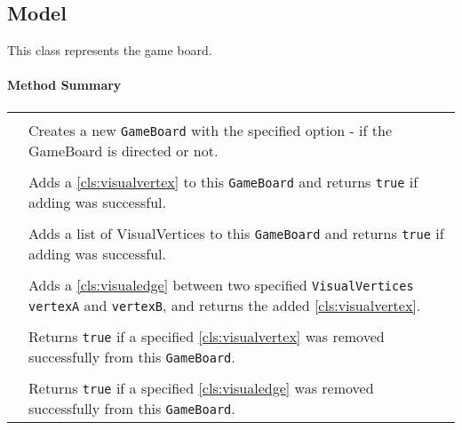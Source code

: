 \subsection{Model}

This class represents the game board. \\

\centerdash

\paragraph*{Method Summary}
\paragraph*{}
\begin{longtable}{Lp{10cm}}
	\startmethodtable
	 \\
	& Creates a new \texttt{GameBoard} with the specified option - if the GameBoard is directed or not. \\
	 \\
	& Adds a \ref{cls:visualvertex} to this \texttt{GameBoard} and returns \texttt{true} if adding was successful. \\
	 \\
	& Adds a list of VisualVertices to this \texttt{GameBoard} and returns \texttt{true} if adding was successful. \\
	 \\
	& Adds a \ref{cls:visualedge} between two specified \texttt{VisualVertices} \texttt{vertexA} and \texttt{vertexB}, and returns the added \ref{cls:visualvertex}. \\
	 \\
	& Returns \texttt{true} if a specified \ref{cls:visualvertex} was removed successfully from this \texttt{GameBoard}. \\
	 \\
	& Returns \texttt{true} if a specified \ref{cls:visualedge} was removed successfully from this \texttt{GameBoard}. \\

\end{longtable}
